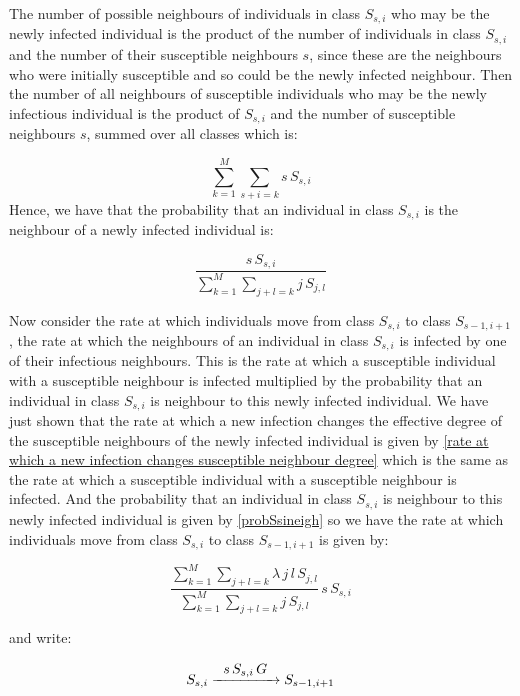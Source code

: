 \documentclass{uonmathsreport}
\begin{document}
\noindent
The number of possible neighbours of individuals in class $S_{s,i}$ who may be the newly infected individual is the product of the number of individuals in class $S_{s,i}$ and the number of their susceptible neighbours $s$, since these are the neighbours who were initially susceptible and so could be the newly infected neighbour. Then the number of all neighbours of susceptible individuals who may be the newly infectious individual is the product of $S_{s,i}$ and the number of susceptible neighbours $s$, summed over all classes which is:

\begin{equation}
\sum_{k=1}^{M}\sum_{s+i=k}s\,S_{s,i}
\end{equation}
\noindent
Hence, we have that the probability that an individual in class $S_{s,i}$ is the neighbour of a newly infected individual is:

\begin{equation}
\frac{s\,S_{s,i}}{\sum_{k=1}^{M}\sum_{j+l=k}j\,S_{j,l}}
\label{probSsineigh}
\end{equation}

Now consider the rate at which individuals move from class $S_{s,i}$ to class $S_{s-1,i+1}$, the rate at which the neighbours of an individual in class $S_{s,i}$ is infected by one of their infectious neighbours. This is the rate at which a susceptible individual with a susceptible neighbour is infected multiplied by the probability that an individual in class $S_{s,i}$ is neighbour to this newly infected individual. We have just shown that the rate at which a new infection changes the effective degree of the susceptible neighbours of the newly infected individual is given by \ref{rate at which a new infection changes susceptible neighbour degree} which is the same as the rate at which a susceptible individual with a susceptible neighbour is infected. And the probability that an individual in class $S_{s,i}$ is neighbour to this newly infected individual is given by \eqref{probSsineigh} so we have the rate at which individuals move from class $S_{s,i}$ to class $S_{s-1,i+1}$ is given by:

\begin{equation}
\frac{\sum_{k=1}^{M}\sum_{j+l=k}\lambda\,j\,l\,S_{j,l}}{\sum_{k=1}^{M}\sum_{j+l=k}j\,S_{j,l}}\,s\,S_{s,i}
\end{equation}

\noindent
and write:

\begin{equation} \label{S_s,i to S_s-1,i+1}
S_{s,i}\xrightarrow{\makebox[1.5cm]{$s\,S_{s,i}\,G$}}S_{s-1,i+1}
\end{equation}
\end{document}
